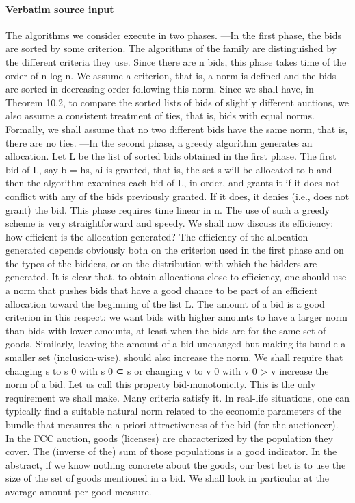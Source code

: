 \documentclass[10pt]{article}
\begin{document}
\paragraph{Verbatim source input}
\begin{ReviewVerbatim}
The algorithms we consider execute in two phases.
—In the first phase, the bids are sorted by some criterion. The algorithms of the
family are distinguished by the different criteria they use. Since there are n bids,
this phase takes time of the order of n log n. We assume a criterion, that is, a norm
is defined and the bids are sorted in decreasing order following this norm. Since
we shall have, in Theorem 10.2, to compare the sorted lists of bids of slightly
different auctions, we also assume a consistent treatment of ties, that is, bids
with equal norms. Formally, we shall assume that no two different bids have the
same norm, that is, there are no ties.
—In the second phase, a greedy algorithm generates an allocation. Let L be the
list of sorted bids obtained in the first phase. The first bid of L, say b = hs, ai is
granted, that is, the set s will be allocated to b and then the algorithm examines
each bid of L, in order, and grants it if it does not conflict with any of the bids
previously granted. If it does, it denies (i.e., does not grant) the bid. This phase
requires time linear in n.
The use of such a greedy scheme is very straightforward and speedy. We shall
now discuss its efficiency: how efficient is the allocation generated? The efficiency
of the allocation generated depends obviously both on the criterion used in the first
phase and on the types of the bidders, or on the distribution with which the bidders
are generated. It is clear that, to obtain allocations close to efficiency, one should use
a norm that pushes bids that have a good chance to be part of an efficient allocation
toward the beginning of the list L. The amount of a bid is a good criterion in this respect: we want bids with higher amounts to have a larger norm than bids with lower
amounts, at least when the bids are for the same set of goods. Similarly, leaving the
amount of a bid unchanged but making its bundle a smaller set (inclusion-wise),
should also increase the norm. We shall require that changing s to s 0 with s 0 ⊂ s
or changing v to v 0 with v 0 > v increase the norm of a bid. Let us call this property
bid-monotonicity. This is the only requirement we shall make. Many criteria
satisfy it.
In real-life situations, one can typically find a suitable natural norm related to the
economic parameters of the bundle that measures the a-priori attractiveness of the
bid (for the auctioneer). In the FCC auction, goods (licenses) are characterized by
the population they cover. The (inverse of the) sum of those populations is a good
indicator. In the abstract, if we know nothing concrete about the goods, our best bet
is to use the size of the set of goods mentioned in a bid. We shall look in particular
at the average-amount-per-good measure.
\end{ReviewVerbatim}
\end{document}
